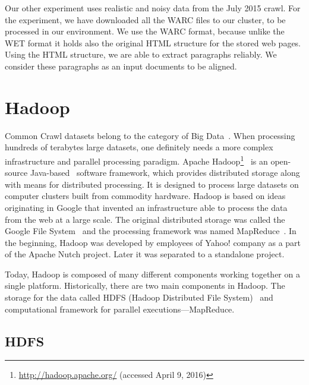 Our other experiment uses realistic and noisy data from the July 2015 crawl. For the experiment, we have downloaded all the WARC files to our cluster, to be processed in our environment. We use the WARC format, because unlike the WET format it holds also the original HTML structure for the stored web pages. Using the HTML structure, we are able to extract paragraphs reliably. We consider these paragraphs as an input documents to be aligned.

\section{Hadoop}
\label{section:hadoop}

Common Crawl datasets belong to the category of Big Data~\cite{Holubova15}. When processing hundreds of terabytes large datasets, one definitely needs a more complex infrastructure and parallel processing paradigm. Apache Hadoop\footnote{\url{http://hadoop.apache.org/} (accessed April 9, 2016)}~\cite{White15} is an open-source Java-based~\cite{Gosling14}\cite{Lindholm14} software framework, which provides distributed storage along with means for distributed processing. It is designed to process large datasets on computer clusters built from commodity hardware. Hadoop is based on ideas originating in Google that invented an infrastructure able to process the data from the web at a large scale. The original distributed storage was called the Google File System~\cite{Ghemawat03} and the processing framework was named MapReduce~\cite{Dean04}. In the beginning, Hadoop was developed by employees of Yahoo! company as a part of the Apache Nutch project. Later it was separated to a standalone project.

Today, Hadoop is composed of many different components working together on a single platform. Historically, there are two main components in Hadoop. The storage for the data called HDFS (Hadoop Distributed File System)~\cite{Shvachko10} and computational framework for parallel executions---MapReduce. 

\subsection{HDFS}
\label{subsection:hdfs}

